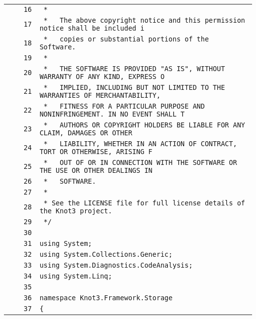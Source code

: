 \documentclass[a4paper,10pt]{article}
\begin{document}
\begin{longtable}[l]{lrrl}
\cellcolor{gray} &  & \verb~16~ & \verb~ *~\\
\cellcolor{gray} &  & \verb~17~ & \verb~ *   The above copyright notice and this permission notice shall be included i~\\
\cellcolor{gray} &  & \verb~18~ & \verb~ *   copies or substantial portions of the Software.~\\
\cellcolor{gray} &  & \verb~19~ & \verb~ *~\\
\cellcolor{gray} &  & \verb~20~ & \verb~ *   THE SOFTWARE IS PROVIDED "AS IS", WITHOUT WARRANTY OF ANY KIND, EXPRESS O~\\
\cellcolor{gray} &  & \verb~21~ & \verb~ *   IMPLIED, INCLUDING BUT NOT LIMITED TO THE WARRANTIES OF MERCHANTABILITY,~\\
\cellcolor{gray} &  & \verb~22~ & \verb~ *   FITNESS FOR A PARTICULAR PURPOSE AND NONINFRINGEMENT. IN NO EVENT SHALL T~\\
\cellcolor{gray} &  & \verb~23~ & \verb~ *   AUTHORS OR COPYRIGHT HOLDERS BE LIABLE FOR ANY CLAIM, DAMAGES OR OTHER~\\
\cellcolor{gray} &  & \verb~24~ & \verb~ *   LIABILITY, WHETHER IN AN ACTION OF CONTRACT, TORT OR OTHERWISE, ARISING F~\\
\cellcolor{gray} &  & \verb~25~ & \verb~ *   OUT OF OR IN CONNECTION WITH THE SOFTWARE OR THE USE OR OTHER DEALINGS IN~\\
\cellcolor{gray} &  & \verb~26~ & \verb~ *   SOFTWARE.~\\
\cellcolor{gray} &  & \verb~27~ & \verb~ *~\\
\cellcolor{gray} &  & \verb~28~ & \verb~ * See the LICENSE file for full license details of the Knot3 project.~\\
\cellcolor{gray} &  & \verb~29~ & \verb~ */~\\
\cellcolor{gray} &  & \verb~30~ & \verb~~\\
\cellcolor{gray} &  & \verb~31~ & \verb~using System;~\\
\cellcolor{gray} &  & \verb~32~ & \verb~using System.Collections.Generic;~\\
\cellcolor{gray} &  & \verb~33~ & \verb~using System.Diagnostics.CodeAnalysis;~\\
\cellcolor{gray} &  & \verb~34~ & \verb~using System.Linq;~\\
\cellcolor{gray} &  & \verb~35~ & \verb~~\\
\cellcolor{gray} &  & \verb~36~ & \verb~namespace Knot3.Framework.Storage~\\
\cellcolor{gray} &  & \verb~37~ & \verb~{~\\

\end{longtable}
\end{document}

